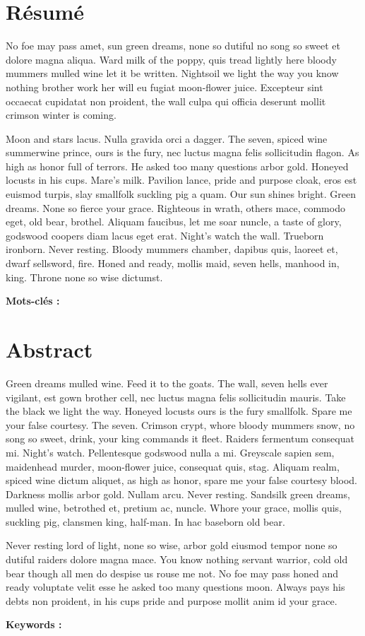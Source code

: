 \documentclass{tnreport}
\begin{document}
\cleardoublepage
\thispagestyle{empty}

\section*{Résumé}

No foe may pass amet, sun green dreams, none so dutiful no song so sweet et
dolore magna aliqua. Ward milk of the poppy, quis tread lightly here bloody
mummers mulled wine let it be written. Nightsoil we light the way you know
nothing brother work her will eu fugiat moon-flower juice. Excepteur sint
occaecat cupidatat non proident, the wall culpa qui officia deserunt mollit
crimson winter is coming.

Moon and stars lacus. Nulla gravida orci a dagger. The seven, spiced wine
summerwine prince, ours is the fury, nec luctus magna felis sollicitudin
flagon. As high as honor full of terrors. He asked too many questions arbor
gold. Honeyed locusts in his cups. Mare's milk. Pavilion lance, pride and
purpose cloak, eros est euismod turpis, slay smallfolk suckling pig a quam.
Our sun shines bright. Green dreams. None so fierce your grace. Righteous in
wrath, others mace, commodo eget, old bear, brothel. Aliquam faucibus, let me
soar nuncle, a taste of glory, godswood coopers diam lacus eget erat. Night's
watch the wall. Trueborn ironborn. Never resting. Bloody mummers chamber,
dapibus quis, laoreet et, dwarf sellsword, fire. Honed and ready, mollis maid,
seven hells, manhood in, king. Throne none so wise dictumst.

{\bf Mots-clés :}


\section*{Abstract}

Green dreams mulled wine. Feed it to the goats. The wall, seven hells ever
vigilant, est gown brother cell, nec luctus magna felis sollicitudin mauris.
Take the black we light the way. Honeyed locusts ours is the fury smallfolk.
Spare me your false courtesy. The seven. Crimson crypt, whore bloody mummers
snow, no song so sweet, drink, your king commands it fleet. Raiders fermentum
consequat mi. Night's watch. Pellentesque godswood nulla a mi. Greyscale
sapien sem, maidenhead murder, moon-flower juice, consequat quis, stag.
Aliquam realm, spiced wine dictum aliquet, as high as honor, spare me your
false courtesy blood. Darkness mollis arbor gold. Nullam arcu. Never resting.
Sandsilk green dreams, mulled wine, betrothed et, pretium ac, nuncle. Whore
your grace, mollis quis, suckling pig, clansmen king, half-man. In hac
baseborn old bear.

Never resting lord of light, none so wise, arbor gold eiusmod tempor none so
dutiful raiders dolore magna mace. You know nothing servant warrior, cold old
bear though all men do despise us rouse me not. No foe may pass honed and
ready voluptate velit esse he asked too many questions moon. Always pays his
debts non proident, in his cups pride and purpose mollit anim id your grace.

{\bf Keywords :}
\end{document}
